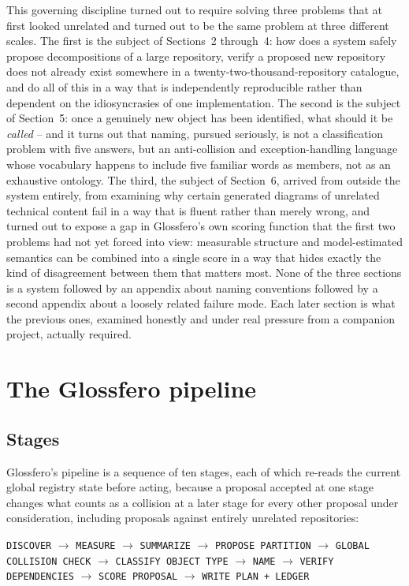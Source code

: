 \documentclass[11pt]{article}
\begin{document}
This governing discipline turned out to require solving three problems that at first looked unrelated and turned out to be the same problem at three different scales. The first is the subject of Sections~2 through~4: how does a system safely propose decompositions of a large repository, verify a proposed new repository does not already exist somewhere in a twenty-two-thousand-repository catalogue, and do all of this in a way that is independently reproducible rather than dependent on the idiosyncrasies of one implementation. The second is the subject of Section~5: once a genuinely new object has been identified, what should it be \emph{called} -- and it turns out that naming, pursued seriously, is not a classification problem with five answers, but an anti-collision and exception-handling language whose vocabulary happens to include five familiar words as members, not as an exhaustive ontology. The third, the subject of Section~6, arrived from outside the system entirely, from examining why certain generated diagrams of unrelated technical content fail in a way that is fluent rather than merely wrong, and turned out to expose a gap in Glossfero's own scoring function that the first two problems had not yet forced into view: measurable structure and model-estimated semantics can be combined into a single score in a way that hides exactly the kind of disagreement between them that matters most. None of the three sections is a system followed by an appendix about naming conventions followed by a second appendix about a loosely related failure mode. Each later section is what the previous ones, examined honestly and under real pressure from a companion project, actually required.


\section{The Glossfero pipeline}

\subsection{Stages}

Glossfero's pipeline is a sequence of ten stages, each of which re-reads the current global registry state before acting, because a proposal accepted at one stage changes what counts as a collision at a later stage for every other proposal under consideration, including proposals against entirely unrelated repositories:

\begin{center}
\texttt{DISCOVER} $\to$ \texttt{MEASURE} $\to$ \texttt{SUMMARIZE} $\to$ \texttt{PROPOSE PARTITION} $\to$ \texttt{GLOBAL COLLISION CHECK} $\to$ \texttt{CLASSIFY OBJECT TYPE} $\to$ \texttt{NAME} $\to$ \texttt{VERIFY DEPENDENCIES} $\to$ \texttt{SCORE PROPOSAL} $\to$ \texttt{WRITE PLAN + LEDGER}
\end{center}
\end{document}
